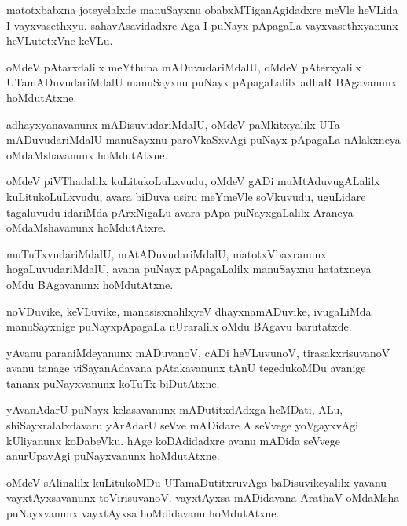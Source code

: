 \documentclass{article}
\begin{document}
\begin{mn}%
matotxbabxna joteyelalxde manuSayxnu obabxMTiganAgidadxre meVle heVLida I vayxvasethxyu. 
sahavAsavidadxre Aga I puNayx pApagaLa vayxvasethxyanunx heVLutetxVne keVLu.
\end{mn}

\begin{mn}%
oMdeV pAtarxdalilx meYthuna mADuvudariMdalU, oMdeV pAterxyalilx UTamADuvudariMdalU manuSayxnu 
puNayx pApagaLalilx adhaR BAgavanunx hoMdutAtxne.
\end{mn}

\begin{mn}%
adhayxyanavanunx mADisuvudariMdalU, oMdeV paMkitxyalilx UTa mADuvudariMdalU manuSayxnu 
paroVkaSxvAgi puNayx pApagaLa nAlakxneya oMdaMshavanunx hoMdutAtxne.
\end{mn}

\begin{mn}%
oMdeV piVThadalilx kuLitukoLuLxvudu, oMdeV gADi muMtAduvugALalilx kuLitukoLuLxvudu, avara biDuva 
usiru meYmeVle soVkuvudu, uguLidare tagaluvudu idariMda pArxNigaLu avara pApa puNayxgaLalilx 
Araneya oMdaMshavanunx hoMdutAtxre.
\end{mn}

\begin{mn}%
muTuTxvudariMdalU, mAtADuvudariMdalU, matotxVbaxranunx hogaLuvudariMdalU, avana puNayx 
pApagaLalilx manuSayxnu hatatxneya oMdu BAgavanunx hoMdutAtxne.
\end{mn}

\begin{mn}%
noVDuvike, keVLuvike, manasisxnalilxyeV dhayxnamADuvike, ivugaLiMda manuSayxnige puNayxpApagaLa 
nUraralilx oMdu BAgavu barutatxde.
\end{mn}

\begin{mn}%
yAvanu paraniMdeyanunx mADuvanoV, cADi heVLuvunoV, tirasakxrisuvanoV avanu tanage viSayanAdavana 
pAtakavanunx tAnU tegedukoMDu avanige tananx puNayxvanunx koTuTx biDutAtxne.
\end{mn}

\begin{mn}%
yAvanAdarU puNayx kelasavanunx mADutitxdAdxga heMDati, ALu, shiSayxralalxdavaru yArAdarU seVve 
mADidare A seVvege yoVgayxvAgi kUliyanunx koDabeVku. hAge koDAdidadxre avanu mADida seVvege 
anurUpavAgi puNayxvanunx hoMdutAtxne.
\end{mn}

\begin{mn}%
oMdeV sAlinalilx kuLitukoMDu UTamaDutitxruvAga baDisuvikeyalilx yavanu vayxtAyxsavanunx 
toVirisuvanoV. vayxtAyxsa mADidavana ArathaV oMdaMsha puNayxvanunx vayxtAyxsa hoMdidavanu 
hoMdutAtxne.
\end{mn}
\end{document}
